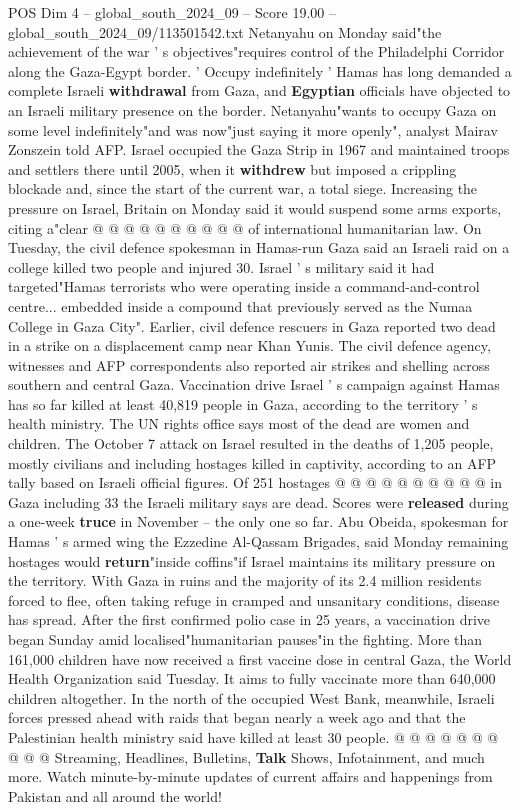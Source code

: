 \begin{textsample}{POS Dim 4 – global\_south\_2024\_09 – Score 19.00 – global\_south\_2024\_09/113501542.txt}
Netanyahu on Monday said"the achievement of the war ' s objectives"requires control of the Philadelphi Corridor along the Gaza-Egypt border. ' Occupy indefinitely ' Hamas has long demanded a complete Israeli \textbf{withdrawal} from Gaza, and \textbf{Egyptian} officials have objected to an Israeli military presence on the border.
Netanyahu"wants to occupy Gaza on some level indefinitely"and was now"just saying it more openly", analyst Mairav Zonszein told AFP.
Israel occupied the Gaza Strip in 1967 and maintained troops and settlers there until 2005, when it \textbf{withdrew} but imposed a crippling blockade and, since the start of the current war, a total siege.
Increasing the pressure on Israel, Britain on Monday said it would suspend some arms exports, citing a"clear @ @ @ @ @ @ @ @ @ @ of international humanitarian law.
On Tuesday, the civil defence spokesman in Hamas-run Gaza said an Israeli raid on a college killed two people and injured 30.
Israel ' s military said it had targeted"Hamas terrorists who were operating inside a command-and-control centre... embedded inside a compound that previously served as the Numaa College in Gaza City".
Earlier, civil defence rescuers in Gaza reported two dead in a strike on a displacement camp near Khan Yunis.
The civil defence agency, witnesses and AFP correspondents also reported air strikes and shelling across southern and central Gaza.
Vaccination drive Israel ' s campaign against Hamas has so far killed at least 40,819 people in Gaza, according to the territory ' s health ministry.
The UN rights office says most of the dead are women and children.
The October 7 attack on Israel resulted in the deaths of 1,205 people, mostly civilians and including hostages killed in captivity, according to an AFP tally based on Israeli official figures.
Of 251 hostages @ @ @ @ @ @ @ @ @ @ in Gaza including 33 the Israeli military says are dead.
Scores were \textbf{released} during a one-week \textbf{truce} in November -- the only one so far.
Abu Obeida, spokesman for Hamas ' s armed wing the Ezzedine Al-Qassam Brigades, said Monday remaining hostages would \textbf{return}"inside coffins"if Israel maintains its military pressure on the territory.
With Gaza in ruins and the majority of its 2.4 million residents forced to flee, often taking refuge in cramped and unsanitary conditions, disease has spread.
After the first confirmed polio case in 25 years, a vaccination drive began Sunday amid localised"humanitarian pauses"in the fighting.
More than 161,000 children have now received a first vaccine dose in central Gaza, the World Health Organization said Tuesday.
It aims to fully vaccinate more than 640,000 children altogether.
In the north of the occupied West Bank, meanwhile, Israeli forces pressed ahead with raids that began nearly a week ago and that the Palestinian health ministry said have killed at least 30 people. @ @ @ @ @ @ @ @ @ @ Streaming, Headlines, Bulletins, \textbf{Talk} Shows, Infotainment, and much more.
Watch minute-by-minute updates of current affairs and happenings from Pakistan and all around the world!


\end{textsample}
